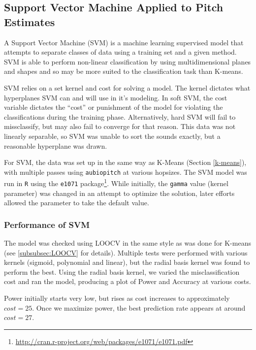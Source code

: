 \documentclass[paper=a4, fontsize=11pt]{scrartcl}
\numberwithin{equation}{section}
\numberwithin{figure}{section}
\numberwithin{table}{section}
\begin{document}
\subsection{Support Vector Machine Applied to Pitch Estimates}
A Support Vector Machine (SVM) is a machine learning supervised model that attempts to separate classes of data using a training set and a given method. SVM is able to perform non-linear classification by using multidimensional planes and shapes and so may be more suited to the classification task than K-means.

\noindent SVM relies on a set kernel and cost for solving a model. The kernel dictates what hyperplanes SVM can and will use in it's modeling. In soft SVM, the cost variable dictates the ``cost'' or punishment of the model for violating the classifications during the training phase. Alternatively, hard SVM will fail to missclassify, but may also fail to converge for that reason. This data was not linearly separable, so SVM was unable to sort the sounds exactly, but a reasonable hyperplane was drawn.

For SVM, the data was set up in the same way as K-Means (Section \ref{k-means}), with multiple passes using \texttt{aubiopitch} at various hopsizes. The SVM model was run in \texttt{R} using the \texttt{e1071} package\footnote{\url{http://cran.r-project.org/web/packages/e1071/e1071.pdf}}. While initially, the \texttt{gamma} value (kernel parameter) was changed in an attempt to optimize the solution, later efforts allowed the parameter to take the default value.

\subsubsection{Performance of SVM}
The model was checked using LOOCV in the same style as was done for K-means (see \ref{subsubsec:LOOCV} for details). Multiple tests were performed with various kernels (sigmoid, polynomial and linear), but the radial basis kernel was found to perform the best. Using the radial basis kernel, we varied the misclassification cost and ran the model, producing a plot of Power and Accuracy at various costs.

Power initially starts very low, but rises as cost increases to approximately $cost = 25$. Once we maximize power, the best prediction rate appears at around $cost = 27$.
\end{document}
